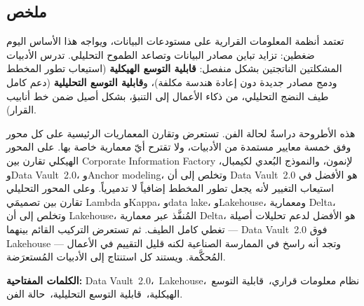 {}

\begin{Arabic}

\chapter*{ملخص}

تعتمد أنظمة المعلومات القرارية على مستودعات البيانات، ويواجه هذا الأساس اليوم ضغطين:
تزايد تباين مصادر البيانات وتصاعد الطموح التحليلي. تدرس الأدبيات المشكلتين الناتجتين
بشكل منفصل: \textbf{قابلية التوسع الهيكلية} (استيعاب تطور المخطط ودمج مصادر جديدة دون
إعادة هندسة مكلفة)، و\textbf{قابلية التوسع التحليلية} (دعم كامل طيف النضج التحليلي،
من ذكاء الأعمال إلى التنبؤ، بشكل أصيل ضمن خط أنابيب القرار).

هذه الأطروحة دراسةٌ لحالة الفن. تستعرض وتقارن المعماريات الرئيسية على كل محور وفق
خمسة معايير مستمدة من الأدبيات، ولا تقترح أيّ معمارية خاصة بها. على المحور الهيكلي تقارن بين
\foreignlanguage{english}{Corporate Information Factory} لإنمون، والنموذج البُعدي
لكيمبال، و\foreignlanguage{english}{Data Vault~2.0}، و\foreignlanguage{english}{Anchor
modeling}، وتخلص إلى أن \foreignlanguage{english}{Data Vault~2.0} هو الأفضل في استيعاب
التغيير لأنه يجعل تطور المخطط إضافياً لا تدميرياً. وعلى المحور التحليلي تقارن بين
تصميمَي \foreignlanguage{english}{Lambda} و\foreignlanguage{english}{Kappa}،
و\foreignlanguage{english}{data lake}، و\foreignlanguage{english}{Lakehouse}،
ومعمارية \foreignlanguage{english}{Delta}، وتخلص إلى أن
\foreignlanguage{english}{Lakehouse}، المُنفَّذ عبر معمارية
\foreignlanguage{english}{Delta}، هو الأفضل لدعم تحليلات أصيلة تغطي كامل الطيف. ثم
تستعرض التركيب القائم بينهما --- \foreignlanguage{english}{Data Vault~2.0} فوق
\foreignlanguage{english}{Lakehouse} --- وتجد أنه راسخ في الممارسة الصناعية لكنه قليل
التقييم في الأعمال المُحكَّمة. ويستند كل استنتاج إلى الأدبيات المُستعرَضة.

\bigskip
\vspace{0.5cm}

\noindent\textbf{الكلمات المفتاحية:}
\foreignlanguage{english}{Data Vault~2.0}،\
\foreignlanguage{english}{Lakehouse}،\
نظام معلومات قراري،\
قابلية التوسع الهيكلية،\
قابلية التوسع التحليلية،\
حالة الفن.

\end{Arabic}
